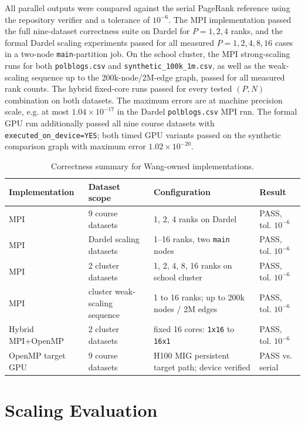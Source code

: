 \documentclass[11pt]{article}
\begin{document}
All parallel outputs were compared against the serial PageRank reference using
the repository verifier and a tolerance of $10^{-6}$. The MPI implementation
passed the full nine-dataset correctness suite on Dardel for $P=1,2,4$ ranks,
and the formal Dardel scaling experiments passed for all measured
$P=1,2,4,8,16$ cases in a two-node \texttt{main}-partition job. On the school cluster, the MPI strong-scaling runs for both
\texttt{polblogs.csv} and \texttt{synthetic\_100k\_1m.csv}, as well as the
weak-scaling sequence up to the 200k-node/2M-edge graph, passed for all
measured rank counts. The hybrid fixed-core runs passed for every tested
$(P,N)$ combination on both datasets. The maximum errors are at machine
precision scale, e.g. at most $1.04\times 10^{-17}$ in the Dardel
\texttt{polblogs.csv} MPI run. The formal GPU run additionally passed all nine
course datasets with \texttt{executed\_on\_device=YES}; both timed GPU
variants passed on the synthetic comparison graph with maximum error
$1.02\times 10^{-20}$.

\begin{table}[H]
\centering
\caption{Correctness summary for Wang-owned implementations.}
\label{tab:wang-correctness}
\small
\begin{tabular}{p{}p{}p{}p{}}
\toprule
Implementation & Dataset scope & Configuration & Result \\
\midrule
MPI & 9 course datasets & 1, 2, 4 ranks on Dardel & PASS, tol. $10^{-6}$ \\
MPI & Dardel scaling datasets & 1--16 ranks, two \texttt{main} nodes & PASS, tol. $10^{-6}$ \\
MPI & 2 cluster datasets & 1, 2, 4, 8, 16 ranks on school cluster & PASS, tol. $10^{-6}$ \\
MPI & cluster weak-scaling sequence & 1 to 16 ranks; up to 200k nodes / 2M edges & PASS, tol. $10^{-6}$ \\
Hybrid MPI+OpenMP & 2 cluster datasets & fixed 16 cores: \texttt{1x16} to \texttt{16x1} & PASS, tol. $10^{-6}$ \\
OpenMP target GPU & 9 course datasets & H100 MIG persistent target path; device verified & PASS vs. serial \\
\bottomrule
\end{tabular}
\end{table}

\section{Scaling Evaluation}
\label{sec:wang-scaling}
\end{document}
